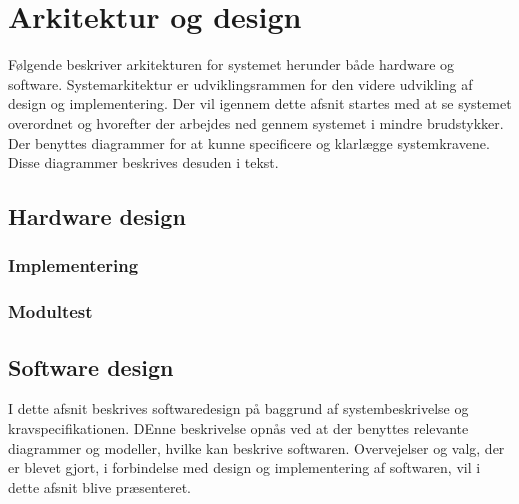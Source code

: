 \chapter{Arkitektur og design}
Følgende beskriver arkitekturen for systemet herunder både hardware og software. 
Systemarkitektur er udviklingsrammen for den videre udvikling af design og implementering. Der vil igennem dette afsnit startes med at se systemet overordnet og hvorefter der arbejdes ned gennem systemet i mindre brudstykker. Der benyttes diagrammer for at kunne specificere og klarlægge systemkravene. Disse diagrammer beskrives desuden i tekst.
\section{Hardware design}

\subsection{Implementering}
\subsection{Modultest}
\section{Software design}
I dette afsnit beskrives softwaredesign på baggrund af systembeskrivelse og kravspecifikationen. DEnne beskrivelse opnås ved at der benyttes relevante diagrammer og modeller, hvilke kan beskrive softwaren. Overvejelser og valg, der er blevet gjort, i forbindelse med design og implementering af softwaren, vil i dette afsnit blive præsenteret.
